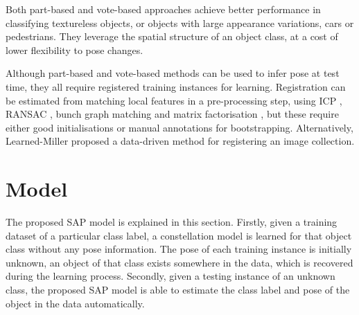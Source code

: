 Both part-based and vote-based approaches achieve better performance in classifying textureless objects, or objects with large appearance variations, \eg cars or pedestrians. They leverage the spatial structure of an object class, at a cost of lower flexibility to pose changes.  





Although part-based and vote-based methods can be used to infer pose at test time, they all require registered training instances for learning.  
Registration can be estimated from matching local features in a pre-processing step, using ICP \cite{Pham2011}, RANSAC \cite{Moreels2007}, bunch graph matching \cite{Wiskott1997} and matrix factorisation \cite{Arie-Nachimson2009}, but these require either good initialisations or manual annotations for bootstrapping. Alternatively, Learned-Miller \cite{Learned-Miller2006} proposed a data-driven method for registering an image collection.  

\section{Model}
\label{sec/reg/framework}

The proposed SAP model is explained in this section. 
Firstly, given a training dataset of a particular class label, a constellation model is learned for that object class without any pose information. The pose of each training instance is initially unknown, \ie an object of that class exists somewhere in the data, which is recovered during the learning process.
Secondly, given a testing instance of an unknown class, the proposed SAP model is able to estimate the class label and pose of the object in the data automatically. 

